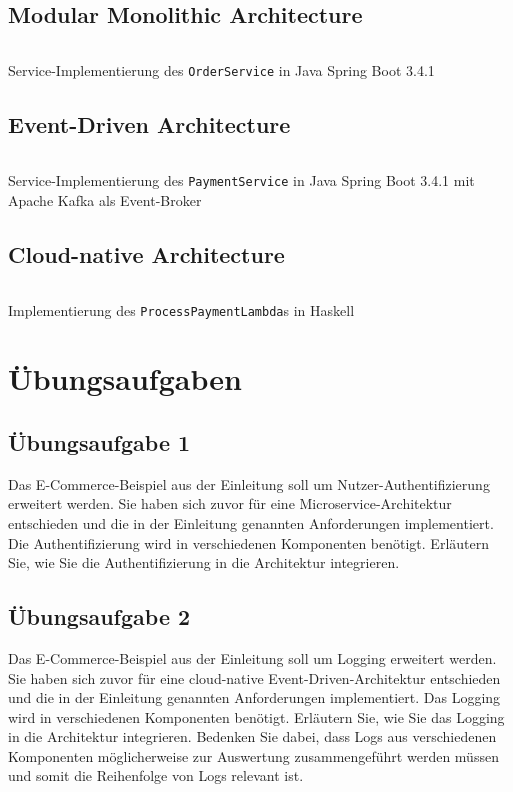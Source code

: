 \documentclass[acmtog]{acmart}
\begin{document}
\subsection{Modular Monolithic Architecture}
\label{app:code:modular:orderservice}
\begin{listing}[H]
  \tiny
  \inputminted[linenos=true]{java}{code/modulithic/OrderServiceImpl.java}
  \caption{Service-Implementierung des \texttt{OrderService} in Java Spring Boot 3.4.1}
\end{listing}

\subsection{Event-Driven Architecture}
\label{app:code:eda:paymentservice}
\begin{listing}[H]
  \tiny
  \inputminted[linenos=true]{java}{code/eda/PaymentService.java}
  \caption{Service-Implementierung des \texttt{PaymentService} in Java Spring Boot 3.4.1 mit Apache Kafka als Event-Broker}
\end{listing}

\subsection{Cloud-native Architecture}
\label{app:code:cloudnative:paymentservice}
\begin{listing}[H]
  \tiny
  \inputminted[linenos=true]{haskell}{code/cloud/PaymentService.hs}
  \caption{Implementierung des \texttt{ProcessPaymentLambda}s in Haskell}
\end{listing}

\section{Übungsaufgaben}
\subsection{Übungsaufgabe 1}
Das E-Commerce-Beispiel aus der Einleitung soll um Nutzer-Authentifizierung erweitert werden.
Sie haben sich zuvor für eine Microservice-Architektur entschieden und die in der Einleitung genannten Anforderungen implementiert.
Die Authentifizierung wird in verschiedenen Komponenten benötigt.
Erläutern Sie, wie Sie die Authentifizierung in die Architektur integrieren.

\subsection{Übungsaufgabe 2}
Das E-Commerce-Beispiel aus der Einleitung soll um Logging erweitert werden.
Sie haben sich zuvor für eine cloud-native Event-Driven-Architektur entschieden und die in der Einleitung genannten Anforderungen implementiert.
Das Logging wird in verschiedenen Komponenten benötigt.
Erläutern Sie, wie Sie das Logging in die Architektur integrieren.
Bedenken Sie dabei, dass Logs aus verschiedenen Komponenten möglicherweise zur Auswertung zusammengeführt werden müssen und somit die Reihenfolge von Logs relevant ist.
\end{document}
